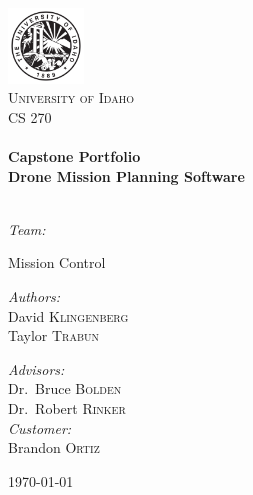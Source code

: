 
\begin{titlepage}
\begin{center}

\includegraphics[width=0.15\textwidth]{./icons/04UI_Seal-Black.jpg}~\\[1cm]

\textsc{\LARGE University of Idaho}\\[1.5cm]

\textsc{\Large CS 270}\\[0.5cm]

\HRule \\[0.4cm]
{ \huge \bfseries Capstone Portfolio \\[0.4cm] }
{ \huge \bfseries Drone Mission Planning Software \\[0.4cm] }
\HRule \\[1.5cm]
\centerline{\emph{Team:}}
\centerline{Mission Control}
\noindent
\begin{minipage}{0.4\textwidth}
\begin{flushleft} \large
\emph{Authors:}\\
David \textsc{Klingenberg}\\
Taylor \textsc{Trabun}
\end{flushleft}
\end{minipage}%
\begin{minipage}{0.4\textwidth}
\begin{flushright} \large
\vspace{20pt}
\emph{Advisors:} \\
Dr.~Bruce \textsc{Bolden}\\
Dr.~Robert \textsc{Rinker}\\
\vspace{10pt}
\emph{Customer:}\\
Brandon \textsc{Ortiz}
\end{flushright}
\end{minipage}

\vfill

{\large \today}

\end{center}
\end{titlepage}